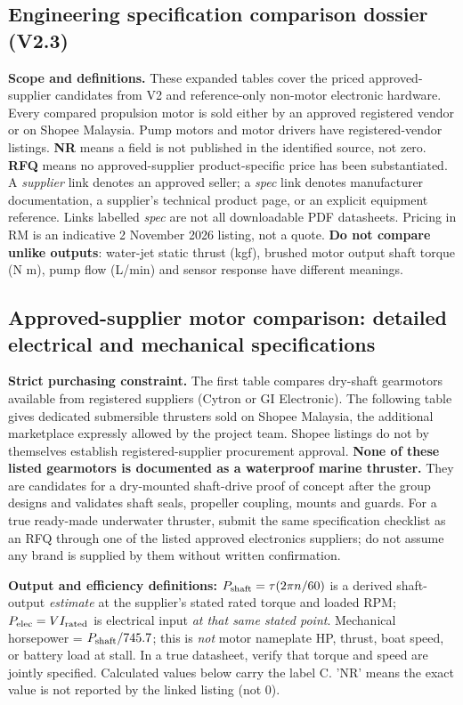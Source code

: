 \documentclass[10pt,a4paper]{article}
\begin{document}
\begin{landscape}
\section{Engineering specification comparison dossier (V2.3)}
\textbf{Scope and definitions.} These expanded tables cover the priced approved-supplier candidates from V2 and reference-only non-motor electronic hardware. Every compared propulsion motor is sold either by an approved registered vendor or on Shopee Malaysia. Pump motors and motor drivers have registered-vendor listings. \textbf{NR} means a field is not published in the identified source, not zero. \textbf{RFQ} means no approved-supplier product-specific price has been substantiated. A \emph{supplier} link denotes an approved seller; a \emph{spec} link denotes manufacturer documentation, a supplier's technical product page, or an explicit equipment reference. Links labelled \emph{spec} are not all downloadable PDF datasheets. Pricing in RM is an indicative 2 November 2026 listing, not a quote. \textbf{Do not compare unlike outputs}: water-jet static thrust (kgf), brushed motor output shaft torque (N m), pump flow (L/min) and sensor response have different meanings.

\subsection{Approved-supplier motor comparison: detailed electrical and mechanical specifications}
\textbf{Strict purchasing constraint.} The first table compares dry-shaft gearmotors available from registered suppliers (Cytron or GI Electronic). The following table gives dedicated submersible thrusters sold on Shopee Malaysia, the additional marketplace expressly allowed by the project team. Shopee listings do not by themselves establish registered-supplier procurement approval. \textbf{None of these listed gearmotors is documented as a waterproof marine thruster.} They are candidates for a dry-mounted shaft-drive proof of concept after the group designs and validates shaft seals, propeller coupling, mounts and guards. For a true ready-made underwater thruster, submit the same specification checklist as an RFQ through one of the listed approved electronics suppliers; do not assume any brand is supplied by them without written confirmation.

\textbf{Output and efficiency definitions:} $P_{\rm shaft}=\tau(2\pi n/60)$ is a derived shaft-output \emph{estimate} at the supplier's stated rated torque and loaded RPM; $P_{\rm elec}=VI_{\rm rated}$ is electrical input \emph{at that same stated point}. Mechanical horsepower = $P_{\rm shaft}/745.7$; this is \emph{not} motor nameplate HP, thrust, boat speed, or battery load at stall. In a true datasheet, verify that torque and speed are jointly specified. Calculated values below carry the label C. 'NR' means the exact value is not reported by the linked listing (not 0).


\end{landscape}
\end{document}
